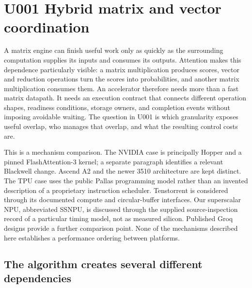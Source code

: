 \section{U001 Hybrid matrix and vector coordination}
\label{sec:u001}

A matrix engine can finish useful work only as quickly as the surrounding computation supplies its inputs and consumes its outputs. Attention makes this dependence particularly visible: a matrix multiplication produces scores, vector and reduction operations turn the scores into probabilities, and another matrix multiplication consumes them. An accelerator therefore needs more than a fast matrix datapath. It needs an execution contract that connects different operation shapes, readiness conditions, storage owners, and completion events without imposing avoidable waiting. The question in U001 is which granularity exposes useful overlap, who manages that overlap, and what the resulting control costs are.

This is a mechanism comparison. The NVIDIA case is principally Hopper and a pinned FlashAttention-3 kernel; a separate paragraph identifies a relevant Blackwell change. Ascend A2 and the newer 3510 architecture are kept distinct. The TPU case uses the public Pallas programming model rather than an invented description of a proprietary instruction scheduler. Tenstorrent is considered through its documented compute and circular-buffer interfaces. Our superscalar NPU, abbreviated SSNPU, is discussed through the supplied source-inspection record of a particular timing model, not as measured silicon. Published Groq designs provide a further comparison point. None of the mechanisms described here establishes a performance ordering between platforms.

\subsection{The algorithm creates several different dependencies}

